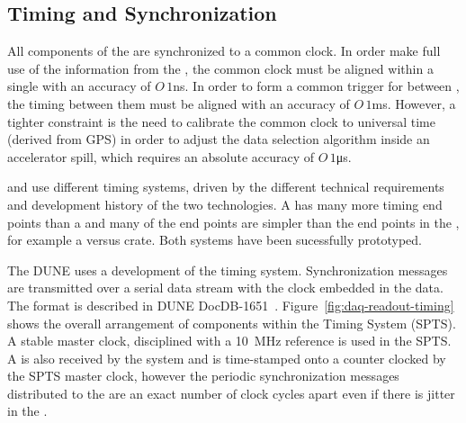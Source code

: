 \subsection{Timing and Synchronization}
\label{sec:fd-daq-timing}



All components of the  are
synchronized to a common clock.  In order make full use of the
information from the , the common clock must be
aligned within a single  with an accuracy of $O\,1$\si{ns}.
In order to form a common trigger for  between
, the timing between them must be aligned with an
accuracy of $O\,1$\si{ms}.  However, a tighter constraint is the need to
calibrate the common clock to universal time (derived from GPS) in
order to adjust the data selection algorithm inside an accelerator
spill, which requires an absolute accuracy of $O\,1$\si{\micro\s}.

\single and \dual {} use different timing systems,
driven by the different technical requirements and development history
of the two technologies. %
A  has many more
timing end points than a  and many of the end points
are simpler than the end points in the \dual{}, for example a 
versus  crate. Both systems have been sucessfully prototyped.

The DUNE  uses a development of the  
timing system. Synchronization messages are transmitted over a serial
data stream with the clock embedded in the data. The format is
described in DUNE DocDB-1651~\cite{docdb-1651}. Figure~\ref{fig:daq-readout-timing}
shows the overall arrangement of components within the \single
Timing System (SPTS). 
A stable master clock, disciplined with a \SI{10}{\MHz}
reference is used in the SPTS. A  is
also received by the system and is time-stamped onto a counter clocked
by the SPTS master clock, however the periodic synchronization
messages distributed to the   are an exact number
of clock cycles apart even if there is jitter in the .

